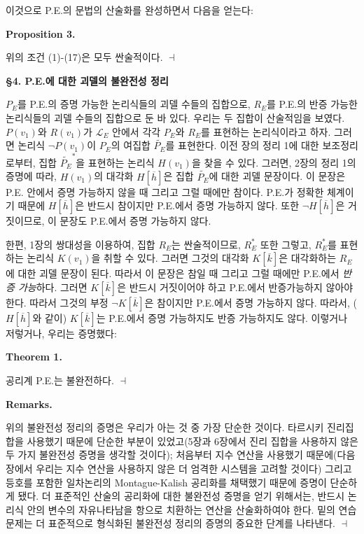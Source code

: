 \documentclass[12pt]{paper}
\newenvironment{context}[1][]
{ \noindent \textbf{{#1}.}
}
{ \hfill $ \dashv $ }
\begin{document}
이것으로 P.E.의 문법의 산술화를 완성하면서 다음을 얻는다:

\begin{context}[Proposition 3]
위의 조건 (1)-(17)은 모두 싼술적이다.
\end{context}

\noindent \textbf{\S4. P.E.에 대한 괴델의 불완전성 정리}

$P_E$를 P.E.의 증명 가능한 논리식들의 괴델 수들의 집합으로,
$R_E$를 P.E.의 반증 가능한 논리식들의 괴델 수들의 집합으로 둔 바 있다.
우리는 두 집합이 산술적임을 보였다.
$P \left( v_1 \right)$와 $R \left( v_1 \right)$가 $\mathcal{L}_E$ 안에서
각각 $P_E$와 $R_E$를 표현하는 논리식이라고 하자.
그러면 논리식 $ \lnot P \left( v_1 \right) $이 $P_E$의 여집합 $\widetilde{P_E}$를 표현한다.
이전 장의 정리 1에 대한 보조정리로부터,
집합 $\widetilde{P_{E}}^{*}$을 표현하는 논리식 $H \left( v_1 \right)$을 찾을 수 있다.
그러면, 2장의 정리 1의 증명에 따라,
$H \left( v_1 \right)$의 대각화 $H \left[ \overline{h} \right]$은 집합 $\widetilde{P_E}$에 대한 괴델 문장이다.
이 문장은 P.E. 안에서 증명 가능하지 않을 때 그리고 그럴 때에만 참이다.
P.E.가 정확한 체계이기 때문에 $H \left[ \overline{h} \right]$은 반드시 참이지만 P.E.에서 증명 가능하지 않다.
또한 $ \lnot H \left[ \overline{h} \right] $은 거짓이므로, 이 문장도 P.E.에서 증명 가능하지 않다.

한편, 1장의 쌍대성을 이용하여, 집합 $R_E$는 싼술적이므로, $R_E^*$ 또한 그렇고,
$R_E^*$를 표현하는 논리식 $K \left( v_1 \right)$을 취할 수 있다.
그러면 그것의 대각화 $K \left[ \overline{k} \right]$은 대각화하는 $R_E$에 대한 괴델 문장이 된다.
따라서 이 문장은 참일 때 그리고 그럴 때에만 P.E.에서 \textit{반증 가능}하다.
그러면 $K \left[ \overline{k} \right]$은 반드시 거짓이어야 하고 P.E.에서 반증가능하지 않아야 한다.
따라서 그것의 부정 $\lnot K \left[ \overline{k} \right]$은 참이지만 P.E.에서 증명 가능하지 않다.
따라서, ($H \left[ \overline{h} \right]$와 같이) $K \left[ \overline{k} \right]$는 P.E.에서 증명 가능하지도 반증 가능하지도 않다.
이렇거나 저렇거나, 우리는 증명했다:

\begin{context}[Theorem 1]
공리계 P.E.는 불완전하다.
\end{context}

\begin{context}[Remarks]
위의 불완전성 정리의 증명은 우리가 아는 것 중 가장 단순한 것이다.
타르시키 진리집합을 사용했기 때문에 단순한 부분이 있었고(5장과 6장에서 진리 집합을 사용하지 않은 두 가지 불완전성 증명을 생각할 것이다);
처음부터 지수 연산을 사용했기 때문에(다음 장에서 우리는 지수 연산을 사용하지 않은 더 엄격한 시스템을 고려할 것이다)
그리고 등호를 포함한 일차논리의 Montague-Kalish 공리화를 채택했기 때문에 증명이 단순하게 됐다.
더 표준적인 산술의 공리화에 대한 불완전성 증명을 얻기 위해서는,
반드시 논리식 안의 변수의 자유나타남을 항으로 치환하는 연산을 산술화하여야 한다.
밑의 연습문제는 더 표준적으로 형식화된 불완전성 정리의 증명의 중요한 단계를 나타낸다.
\end{context}
\end{document}
